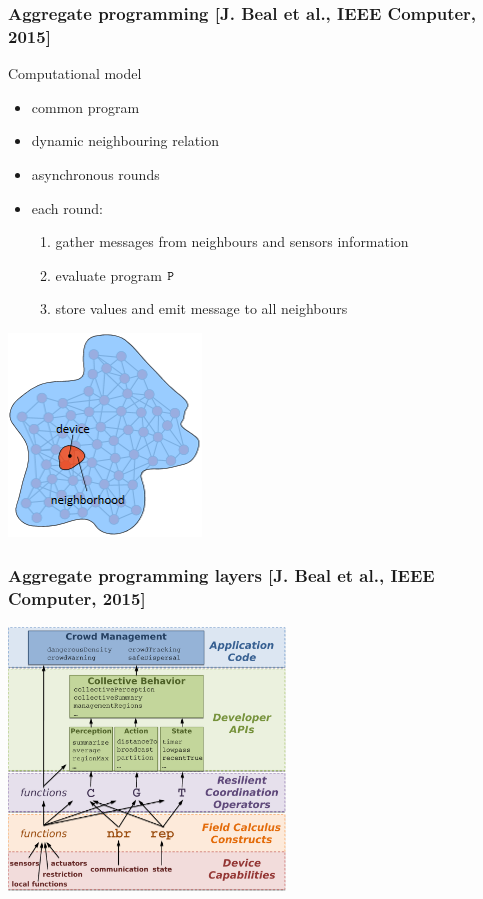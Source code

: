\begin{frame}
\frametitle{Aggregate programming \small [J. Beal et al., IEEE Computer, 2015]}
\begin{block}{Computational model}
\begin{itemize}
\item common program
\item dynamic neighbouring relation
\item asynchronous rounds
\item each round:
\begin{enumerate}
\item gather messages from neighbours and sensors information
\item evaluate program $\mathtt{P}$
\item store values and emit message to all neighbours
\end{enumerate}
\end{itemize}
\end{block}
\centering
\medskip
\includegraphics[width=0.2\linewidth]{imgs/dev-nei.png}
\end{frame}


\begin{frame}
\centering
\frametitle{Aggregate programming layers \small [J. Beal et al., IEEE Computer, 2015]}
\includegraphics[height=7cm]{imgs/layers.pdf}
\end{frame}

